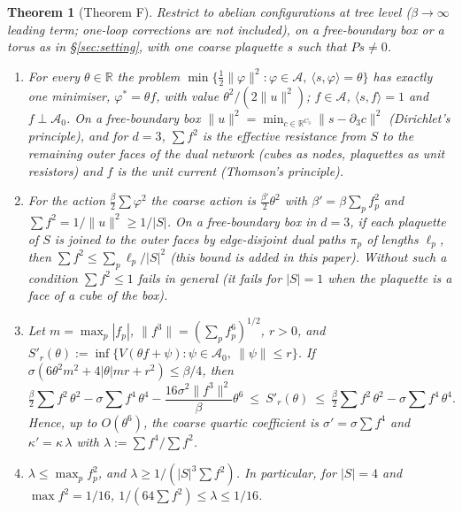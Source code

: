 \documentclass[11pt,a4paper]{article}
\newtheorem{theorem}{Theorem}[section]
\theoremstyle{definition}
\theoremstyle{remark}
\newcommand{\R}{\mathbb{R}}
\newcommand{\cA}{\mathcal{A}}
\begin{document}
\begin{theorem}[Theorem F]\label{thm:F}
Restrict to abelian configurations at tree level ($\beta\to\infty$ leading term; one-loop corrections are not included), on a free-boundary box or a torus as in \S\ref{sec:setting}, with one coarse plaquette $s$ such that $Ps\neq0$.
\begin{enumerate}[label=(\roman*)]
\item For every $\theta\in\R$ the problem $\min\{\frac12\|\varphi\|^2:\varphi\in\cA,\ \langle s,\varphi\rangle=\theta\}$ has exactly one minimiser, $\varphi^*=\theta f$, with value $\theta^2/(2\|u\|^2)$; $f\in\cA$, $\langle s,f\rangle=1$ and $f\perp\cA_0$. On a free-boundary box $\|u\|^2=\min_{c\in\R^{C_3}}\|s-\partial_3c\|^2$ (Dirichlet's principle), and for $d=3$, $\sum f^2$ is the effective resistance from $S$ to the remaining outer faces of the dual network (cubes as nodes, plaquettes as unit resistors) and $f$ is the unit current (Thomson's principle).
\item For the action $\frac\beta2\sum\varphi^2$ the coarse action is $\frac{\beta'}{2}\theta^2$ with $\beta'=\beta\sum_pf_p^2$ and $\sum f^2=1/\|u\|^2\ge1/|S|$. On a free-boundary box in $d=3$, if each plaquette of $S$ is joined to the outer faces by edge-disjoint dual paths $\pi_p$ of lengths $\ell_p$, then $\sum f^2\le\sum_p\ell_p/|S|^2$ (this bound is added in this paper). Without such a condition $\sum f^2\le1$ fails in general (it fails for $|S|=1$ when the plaquette is a face of a cube of the box).
\item Let $m=\max_p|f_p|$, $\|f^3\|=(\sum_pf_p^6)^{1/2}$, $r>0$, and $S'_r(\theta):=\inf\{V(\theta f+\psi):\psi\in\cA_0,\ \|\psi\|\le r\}$. If $\sigma(6\theta^2m^2+4|\theta|mr+r^2)\le\beta/4$, then
\[
\tfrac{\beta}{2}{\textstyle\sum} f^2\,\theta^2-\sigma{\textstyle\sum} f^4\,\theta^4-\frac{16\sigma^2\|f^3\|^2}{\beta}\theta^6\ \le\ S'_r(\theta)\ \le\ \tfrac{\beta}{2}{\textstyle\sum} f^2\,\theta^2-\sigma{\textstyle\sum} f^4\,\theta^4 .
\]
Hence, up to $O(\theta^6)$, the coarse quartic coefficient is $\sigma'=\sigma\sum f^4$ and $\kappa'=\kappa\,\lambda$ with $\lambda:=\sum f^4/\sum f^2$.
\item $\lambda\le\max_pf_p^2$, and $\lambda\ge 1/(|S|^3\sum f^2)$. In particular, for $|S|=4$ and $\max f^2=1/16$, $1/(64\sum f^2)\le\lambda\le1/16$.
\end{enumerate}
\end{theorem}
\end{document}

